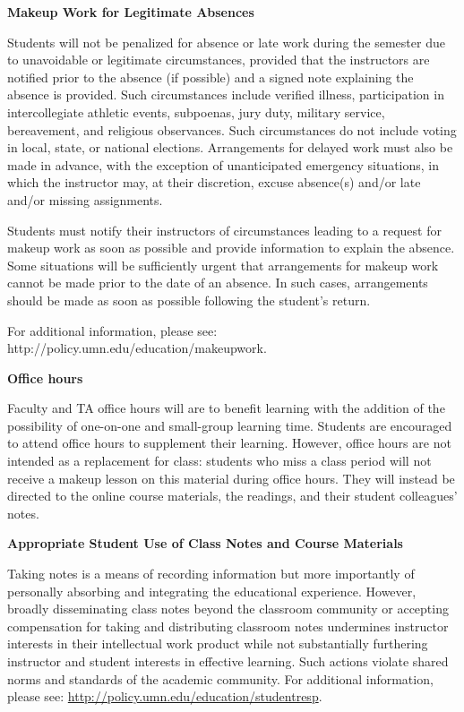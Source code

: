 \documentclass[11pt]{article}
\begin{document}
\vspace{10pt}
\noindent\textbf{Makeup Work for Legitimate Absences}

\hspace{3mm}
Students will not be penalized for absence or late work during the semester due to unavoidable or legitimate circumstances, provided that the instructors are notified prior to the absence (if possible) and a signed note explaining the absence is provided. Such circumstances include verified illness, participation in intercollegiate athletic events, subpoenas, jury duty, military service, bereavement, and religious observances. Such circumstances do not include voting in local, state, or national elections. Arrangements for delayed work must also be made in advance, with the exception of unanticipated emergency situations, in which the instructor may, at their discretion, excuse absence(s) and/or late and/or missing assignments.

Students must notify their instructors of circumstances leading to a request for makeup work as soon as possible and provide information to explain the absence. Some situations will be sufficiently urgent that arrangements for makeup work cannot be made prior to the date of an absence.  In such cases, arrangements should be made as soon as possible following the student’s return.

For additional information, please see: http://policy.umn.edu/education/makeupwork.

\vspace{10pt}
\noindent\textbf{Office hours}

\hspace{3mm}
Faculty and TA office hours will are to benefit learning with the addition of the possibility of one-on-one and small-group learning time. Students are encouraged to attend office hours to supplement their learning. However, office hours are not intended as a replacement for class: students who miss a class period will not receive a makeup lesson on this material during office hours. They will instead be directed to the online course materials, the readings, and their student colleagues' notes.

\vspace{10pt}
\noindent\textbf{Appropriate Student Use of Class Notes and Course Materials}

\hspace{3mm}
Taking notes is a means of recording information but more importantly of personally absorbing and integrating the educational experience. However, broadly disseminating class notes beyond the classroom community or accepting compensation for taking and distributing classroom notes undermines instructor interests in their intellectual work product while not substantially furthering instructor and student interests in effective learning. Such actions violate shared norms and standards of the academic community. For additional information, please see: \url{http://policy.umn.edu/education/studentresp}.
\end{document}
